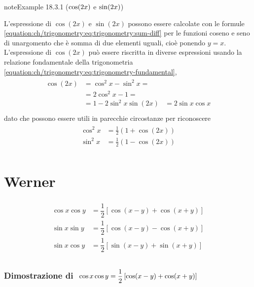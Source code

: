 \documentclass[letterpaper,10pt,italian]{jupyterBook}
\begin{document}
\begin{sphinxadmonition}{note}{Example 18.3.1 (\protect\(\cos(2x) \protect\) e \protect\(\sin(2x)\protect\))}



\sphinxAtStartPar
L’espressione di \(\cos(2x)\) e \(\sin(2x)\) possono essere calcolate con le formule \eqref{equation:ch/trigonometry:eq:trigonometry:sum-diff} per le funzioni coseno e seno di unargomento che è somma di due elementi uguali, cioè ponendo  \(y = x\). L’espressione di \(\cos(2x)\) può essere riscritta in diverse espressioni usando la relazione fondamentale della trigonometria \eqref{equation:ch/trigonometry:eq:trigonometry-fundamental},
\begin{equation}\label{equation:ch/trigonometry:eq:trigonometry:cos2x-sin2x}
\begin{split}\begin{aligned}
  \cos ( 2x ) & = \cos^2 x - \sin^2 x = \\
              & = 2 \cos^2 x - 1 = \\
              & = 1 - 2 \sin^2 x 
  \sin ( 2x ) & = 2 \sin x \cos x \\
\end{aligned}\end{split}
\end{equation}
\sphinxAtStartPar
dato che possono essere utili in parecchie circostanze per riconoscere
\begin{equation}\label{equation:ch/trigonometry:eq:trigonometry:cosTo2x-sinTo2x}
\begin{split}\begin{aligned}
  \cos^2 x & = \frac{1}{2} \left( 1 + \cos (2x) \right) \\
  \sin^2 x & = \frac{1}{2} \left( 1 - \cos (2x) \right) \\
\end{aligned}\end{split}
\end{equation}\end{sphinxadmonition}


\section{Werner}
\label{\detokenize{ch/trigonometry:werner}}\begin{equation*}
\begin{split}\begin{aligned}
  \cos x \cos y & = \dfrac{1}{2} \left[ \cos( x - y ) + \cos ( x + y ) \right] \\
  \sin x \sin y & = \dfrac{1}{2} \left[ \cos( x - y ) - \cos ( x + y ) \right] \\
  \sin x \cos y & = \dfrac{1}{2} \left[ \sin( x - y ) + \sin ( x + y ) \right] \\
\end{aligned}\end{split}
\end{equation*}\subsubsection*{Dimostrazione di \protect\(\ \cos x \cos y = \dfrac{1}{2} \left[ \cos( x - y ) + \cos ( x + y ) \right]\protect\)}
\end{document}
